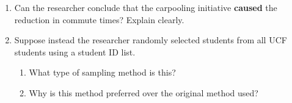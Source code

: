 {\begin{enumerate}[label=(\alph*)]
    \item Can the researcher conclude that the carpooling initiative \textbf{caused} the reduction in commute times? Explain clearly.

    \item Suppose instead the researcher randomly selected students from all UCF students using a student ID list.
    \begin{enumerate}[label=\roman*.]
        \item What type of sampling method is this?
        \item Why is this method preferred over the original method used?
    \end{enumerate}
\end{enumerate}
}
